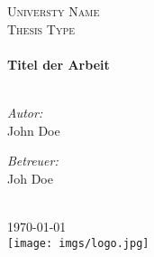 \begin{titlepage}
\begin{center}

\textsc{\LARGE Universty Name}\\[1.5cm] %
\textsc{\Large Thesis Type}\\[0.5cm] %

\HRule \\[0.4cm] %
{\huge \bfseries Titel der Arbeit}\\[0.4cm] %
\HRule \\[1.5cm] %
 
\begin{minipage}{0.4\textwidth}
\begin{flushleft} \large
\emph{Autor:}\\
{John Doe} %
\end{flushleft}
\end{minipage}
\begin{minipage}{0.4\textwidth}
\begin{flushright} \large
\emph{Betreuer:} \\
{Joh Doe} %
\end{flushright}
\end{minipage}\\[3cm]
 
{\large \today}\\[4cm] %
\texttt{[image: imgs/logo.jpg]} %
 
\vfill
\end{center}

\end{titlepage}
